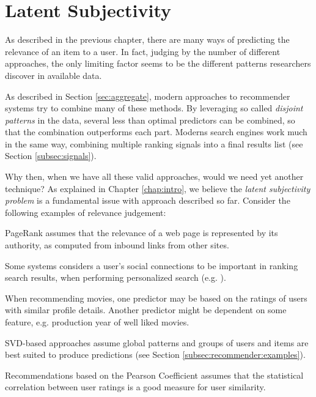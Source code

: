 \section{Latent Subjectivity}
\label{sec:reasoning}

As described in the previous chapter, 
there are many ways of predicting the
relevance of an item to a user. 
In fact, judging by the number of different approaches,
the only limiting factor seems to be the different 
patterns researchers discover in available data.

As described in Section \ref{sec:aggregate},
modern approaches to recommender systems try to combine many of these methods.
By leveraging so called \emph{disjoint patterns}
in the data, several less than optimal predictors
can be combined, so that the combination outperforms each part.
Moderns search engines work much in the same way,
combining multiple ranking signals into a final results list
(see Section \ref{subsec:signals}).

Why then, when we have all these valid approaches, would we need yet another technique?
As explained in Chapter \ref{chap:intro}, 
we believe the \emph{latent subjectivity problem}
is a fundamental issue with approach described so far.
Consider the following examples of relevance judgement:

\begin{itemize*}
  \item PageRank \citep{Bender2005} assumes that the relevance of a web page is 
  represented by its authority, as computed from inbound links from other sites.
  \item Some systems considers a user's social connections to be important
  in ranking search results, when performing personalized search (e.g. \cite{Carmel2009}).
  \item When recommending movies, one predictor may be based on the ratings
  of users with similar profile details. Another predictor might be 
  dependent on some feature, e.g. production year of well liked movies.
  \item SVD-based approaches assume global patterns and groups of users and items
  are best suited to produce predictions (see Section \ref{subsec:recommender:examples}).
  \item Recommendations based on the Pearson Coefficient \cite[p11]{Segaran2007}
  assumes that the statistical correlation between user ratings is a good
  measure for user similarity.
\end{itemize*}

